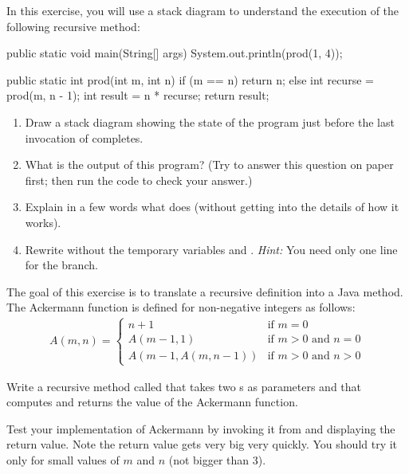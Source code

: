 \begin{exercise}  %

In this exercise, you will use a stack diagram to understand the execution of the following recursive method:

\begin{code}
public static void main(String[] args) {
    System.out.println(prod(1, 4));
}

public static int prod(int m, int n) {
    if (m == n) {
        return n;
    } else {
        int recurse = prod(m, n - 1);
        int result = n * recurse;
        return result;
    }
}
\end{code}

\begin{enumerate}

\item Draw a stack diagram showing the state of the program just before the last invocation of  completes.

\item What is the output of this program?
(Try to answer this question on paper first; then run the code to check your answer.)

\item Explain in a few words what  does (without getting into the details of how it works).

\item Rewrite  without the temporary variables  and .
%
{\em Hint:} You need only one line for the  branch.

\end{enumerate}

\end{exercise}


\begin{exercise}  %

The goal of this exercise is to translate a recursive definition into a Java method.
The Ackermann function is defined for non-negative integers as follows:
\begin{eqnarray*}
A(m, n) = \begin{cases}
              n+1 & \mbox{if } m = 0 \\
        A(m-1, 1) & \mbox{if } m > 0 \mbox{ and } n = 0 \\
A(m-1, A(m, n-1)) & \mbox{if } m > 0 \mbox{ and } n > 0
\end{cases}
\end{eqnarray*}

Write a recursive method called  that takes two s as parameters and that computes and returns the value of the Ackermann function.

Test your implementation of Ackermann by invoking it from  and displaying the return value.
Note the return value gets very big very quickly.
You should try it only for small values of $m$ and $n$ (not bigger than 3).

\end{exercise}


